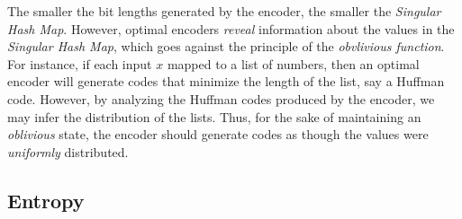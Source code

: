 \documentclass[11pt,final,hidelinks]{article}
\theoremstyle{plain}
\begin{document}
The smaller the bit lengths generated by the encoder, the smaller the \emph{Singular Hash Map}.
However, optimal encoders \emph{reveal} information about the values in the \emph{Singular Hash Map}, which goes against the principle of the \emph{obvlivious function}.
For instance, if each input $x$ mapped to a list of numbers, then an optimal encoder will generate codes that minimize the length of the list, say a Huffman code.
However, by analyzing the Huffman codes produced by the encoder, we may infer the distribution of the lists.
Thus, for the sake of maintaining an \emph{oblivious} state, the encoder should generate codes as though the values were \emph{uniformly} distributed.

\subsection{Entropy}

%
%
%
%




\end{document}
